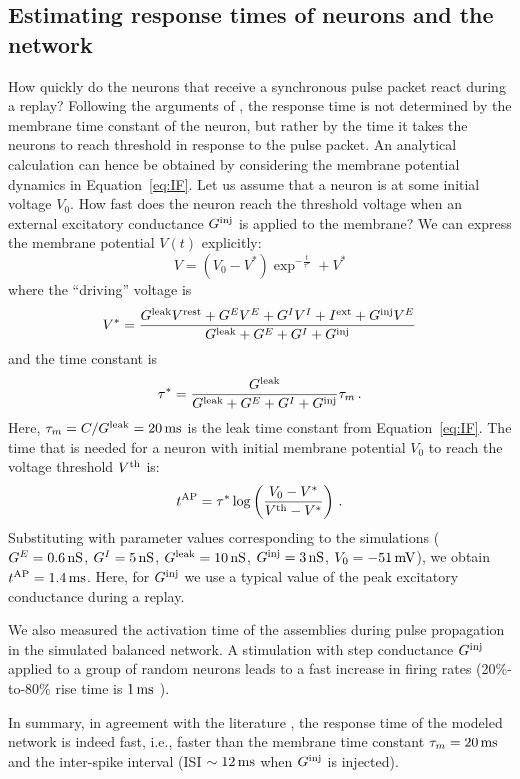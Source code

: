   \subsection{Estimating response times of neurons and the network}
    How quickly do the neurons that receive a synchronous pulse packet react
    during a replay? Following the arguments of
    \cite{Diesmann1999}, the response time is not determined by the membrane time
    constant of the neuron, but rather by the time it takes the neurons to
    reach threshold in response to the pulse packet. An analytical calculation
    can hence be obtained by considering the membrane potential dynamics in
    Equation~\ref{eq:IF}. Let us assume that a neuron is at some initial voltage
    $V_0$. How fast does the neuron reach the threshold voltage when an
    external excitatory conductance $G^{\rm inj}$ is applied to the membrane?
    We can express the membrane potential $V(t)$ explicitly:
    \[
      V = (V_0 - V^*)\exp^{-\frac{t}{\tau^*}} + V^*
    \]
    where the ``driving'' voltage is
    \[
      V^* = \frac{
      G^{\rm leak}V^{\rm rest} + G^EV^E + G^IV^I + I^{\rm ext} + G^{\rm inj}V^E}
      {G^{\rm leak} + G^E + G^I + G^{\rm inj}}
    \]
    and the time constant is
    \[
      \tau^* = \frac{G^{\rm leak}}{G^{\rm leak} + G^E + G^I + G^{\rm inj}}\tau_{m}
      \, .
    \]
    Here, $\tau_{m} =C/G^{\rm leak} = 20\,\rm ms$ is the leak time constant
    from Equation~\ref{eq:IF}. The time that is needed for a neuron with initial
    membrane potential $V_0$ to reach the voltage threshold $V^{\rm th}$ is:
    \[
      t^{\rm AP} = \tau^*\log \left( \frac{V_0 - V^*}{V^{\rm th} - V^*} \right) \,.
    \]
    Substituting with parameter values corresponding to the simulations ($G^E =
    0.6 \,\rm nS$, $G^I = 5 \,\rm nS$, $G^{\rm leak} = 10 \,\rm nS$, $G^{\rm
    inj}=3 \,\rm nS$, $V_0=-51 \,\rm mV$), we obtain $t^{\rm AP}=1.4 \,\rm ms$.
    Here, for $G^{\rm inj}$ we use a typical value of the peak excitatory
    conductance during a replay.

    We also measured the activation time of the assemblies during pulse
    propagation in the simulated balanced network. A stimulation with step
    conductance $G^{\rm inj}$ applied to a group of random neurons leads to a
    fast increase in firing rates (20\%-to-80\% rise time is $1 \,\rm ms$ ).

    In summary, in agreement with the literature \citep{Gerstner1995,
    vanVreeswijk1996, vanVreeswijk1998}, the response time of the modeled network
    is indeed fast, i.e., faster than the membrane time constant
    $\tau_{m}=20\,\rm ms$ and the inter-spike interval (ISI $\sim 12 \,\rm ms$
    when $G^{\rm inj}$ is injected).

